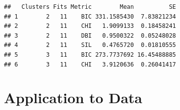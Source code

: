 \documentclass[12pt]{article}
\begin{document}
\begin{verbatim}
##   Clusters Fits Metric        Mean          SE
## 1        2   11    BIC 331.1585430  7.83821234
## 2        2   11    CHI   1.9099133  0.18458241
## 3        2   11    DBI   0.9500322  0.05248028
## 4        2   11    SIL   0.4765720  0.01810555
## 5        3   11    BIC 273.7737692 16.45488885
## 6        3   11    CHI   3.9120636  0.26041417
\end{verbatim}

\hypertarget{application-to-data}{%
\section{Application to Data}\label{application-to-data}}


\renewcommand\refname{Conclusion}

\end{document}
